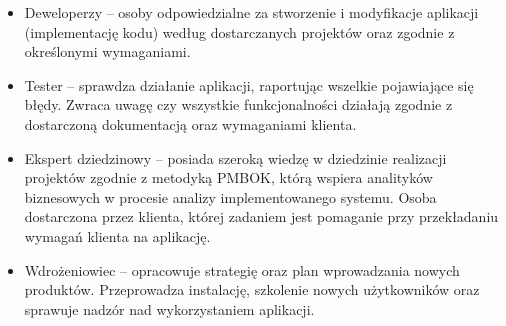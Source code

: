 \begin{itemize}
\item Deweloperzy – osoby odpowiedzialne za stworzenie i modyfikacje aplikacji (implementację kodu) według dostarczanych projektów oraz zgodnie z określonymi wymaganiami.
\item Tester – sprawdza działanie aplikacji, raportując wszelkie pojawiające się błędy. Zwraca uwagę czy wszystkie funkcjonalności działają zgodnie z dostarczoną dokumentacją oraz wymaganiami klienta.
\item Ekspert dziedzinowy – posiada szeroką wiedzę w dziedzinie realizacji projektów zgodnie z metodyką PMBOK, którą wspiera analityków biznesowych w procesie analizy implementowanego systemu. Osoba dostarczona przez klienta, której zadaniem jest pomaganie przy przekładaniu wymagań klienta na aplikację.
\item Wdrożeniowiec – opracowuje strategię oraz plan wprowadzania nowych produktów. Przeprowadza instalację, szkolenie nowych użytkowników oraz sprawuje nadzór nad wykorzystaniem aplikacji.
\end{itemize}


